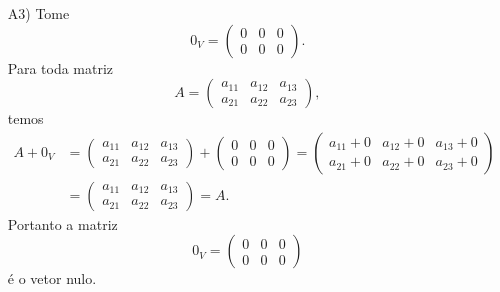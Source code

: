 \begin{exemplo}
\begin{enumerate}[label={\arabic*})]
\begin{solucao}
\begin{itemize}
              \item[A3)] Tome
                \[
                  0_V = \begin{pmatrix}0 & 0 & 0\\0 & 0 & 0\end{pmatrix}.
                \]
                Para toda matriz
                \[
                  A = \begin{pmatrix} a_{11} & a_{12} & a_{13}\\a_{21} & a_{22} & a_{23}\end{pmatrix},
                \]
                temos
                \begin{align*}
                  A + 0_V & = \begin{pmatrix} a_{11} & a_{12} & a_{13}\\a_{21} & a_{22} & a_{23}\end{pmatrix} +
                  \begin{pmatrix}0 & 0 & 0\\0 & 0 & 0\end{pmatrix}
                  = \begin{pmatrix}a_{11} + 0 & a_{12} + 0 & a_{13} + 0\\a_{21} + 0  & a_{22} + 0 & a_{23} + 0\end{pmatrix}
                  \\ &= \begin{pmatrix} a_{11} & a_{12} & a_{13}\\a_{21} & a_{22} & a_{23}\end{pmatrix} = A.
                \end{align*}
                Portanto a matriz
                \[
                  0_V = \begin{pmatrix}0 & 0 & 0\\0 & 0 & 0\end{pmatrix}
                \]
                é o vetor nulo.


\end{itemize}
\end{solucao}
\end{enumerate}
\end{exemplo}
